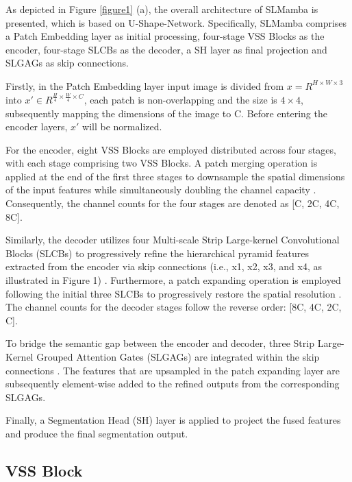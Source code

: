 \documentclass[10pt, a4paper, twocolumn]{article}
\begin{document}
As depicted in Figure \textcolor{red}{\ref{figure1}} (a), the overall architecture of SLMamba is presented, which is based on U-Shape-Network\cite{ronneberger2015unet}. Specifically, SLMamba comprises a Patch Embedding layer as initial processing, four-stage VSS Blocks\cite{liu2024vmamba,gu2023mamba} as the encoder, four-stage SLCBs as the decoder, a SH layer as final projection and SLGAGs as skip connections.

Firstly, in the Patch Embedding layer input image is divided from 
$x=R^{H\times W\times 3} $
into
${x}{'}\in {R}^{\frac{H}{4} \times \frac{W}{4} \times C}$, each patch is non-overlapping and the size is $4 \times 4$, subsequently mapping the dimensions of the image to C. Before entering the encoder layers, ${x}{'}$ will be normalized.

For the encoder, eight VSS Blocks are employed distributed across four stages, with each stage comprising two VSS Blocks. A patch merging operation is applied at the end of the first three stages to downsample the spatial dimensions of the input features while simultaneously doubling the channel capacity \cite{liu2021swin}. Consequently, the channel counts for the four stages are denoted as [C, 2C, 4C, 8C].

Similarly, the decoder utilizes four Multi-scale Strip Large-kernel Convolutional Blocks (SLCBs) to progressively refine the hierarchical pyramid features extracted from the encoder via skip connections (i.e., x1, x2, x3, and x4, as illustrated in Figure 1) \cite{lin2017feature}. Furthermore, a patch expanding operation is employed following the initial three SLCBs to progressively restore the spatial resolution \cite{cao2023swin}. The channel counts for the decoder stages follow the reverse order: [8C, 4C, 2C, C].

To bridge the semantic gap between the encoder and decoder, three Strip Large-Kernel Grouped Attention Gates (SLGAGs) are integrated within the skip connections \cite{oktay2018attention}. The features that are upsampled in the patch expanding layer are subsequently element-wise added to the refined outputs from the corresponding SLGAGs.

Finally, a Segmentation Head (SH) layer is applied to project the fused features and produce the final segmentation output.

\subsection{VSS Block}
\end{document}
